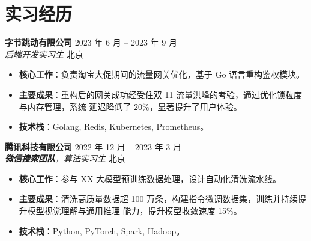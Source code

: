 \documentclass[11pt]{article}
\newlength{\iconwidth}
\begin{document}
    \begin{minipage}[t]{\textwidth}
        \section[实习经历]{\makebox[\iconwidth][c]{\color{primary_color}{\faLaptopCode}}\quad 实习经历}
        \vspace{0.5em}

        {\large \textbf{字节跳动有限公司}} \hfill 2023 年 6 月 -- 2023 年 9 月 \\
        \textit{后端开发实习生} \hfill 北京
        \begin{itemize}
            \item \textbf{核心工作}：负责淘宝大促期间的流量网关优化，基于 Go 语言重构鉴权模块。
            \item \textbf{主要成果}：重构后的网关成功经受住双 11 流量洪峰的考验，通过优化锁粒度与内存管理，系统 延迟降低了 20\%，显著提升了用户体验。
            \item \textbf{技术栈}：Golang, Redis, Kubernetes, Prometheus。
        \end{itemize}
    
        \vspace{0.6em}
    
        {\large \textbf{腾讯科技有限公司}} \hfill 2022 年 12 月 -- 2023 年 3 月 \\
        \textit{\textbf{微信搜索团队}，算法实习生} \hfill 北京
        \begin{itemize}
            \item \textbf{核心工作}：参与 XX 大模型预训练数据处理，设计自动化清洗流水线。
            \item \textbf{主要成果}：清洗高质量数据超 100 万条，构建指令微调数据集，训练并持续提升模型视觉理解与通用推理
            能力，提升模型收敛速度 15\%。
            \item \textbf{技术栈}：Python, PyTorch, Spark, Hadoop。
        \end{itemize}
        
        \vspace{1.2em}
    \end{minipage}
\end{document}
